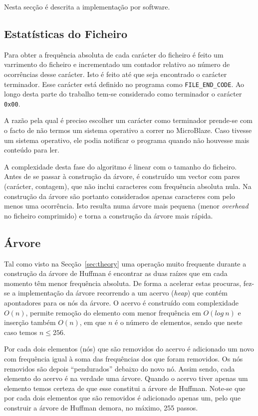 Nesta secção é descrita a implementação por software.

\subsection{Estatísticas do Ficheiro}

Para obter a frequência absoluta de cada carácter do ficheiro é feito um varrimento do ficheiro e incrementado um contador relativo ao número de ocorrências desse carácter. Isto é feito até que seja encontrado o carácter terminador. Esse carácter está definido no programa como \texttt{FILE\_END\_CODE}. Ao longo desta parte do trabalho tem-se considerado como terminador o carácter \texttt{0x00}.

A razão pela qual é preciso escolher um carácter como terminador prende-se com o facto de não termos um sistema operativo a correr no MicroBlaze. Caso tivesse um sistema operativo, ele podia notificar o programa quando não houvesse mais conteúdo para ler.

A complexidade desta fase do algoritmo é linear com o tamanho do ficheiro. Antes de se passar à construção da árvore, é construído um vector com pares (carácter, contagem), que não inclui caracteres com frequência absoluta nula. Na construção da árvore são portanto considerados apenas caracteres com pelo menos uma ocorrência. Isto resulta numa árvore mais pequena (menor \textit{overhead} no ficheiro comprimido) e torna a construção da árvore mais rápida.

\subsection{Árvore}

Tal como visto na Secção~\ref{sec:theory} uma operação muito frequente durante a construção da árvore de Huffman é encontrar as duas raízes que em cada momento têm menor frequência absoluta. De forma a acelerar estas procuras, fez-se a implementação da árvore recorrendo a um acervo (\textit{heap}) que contém apontadores para os nós da árvore. O acervo é construído com complexidade $O(n)$, permite remoção do elemento com menor frequência em $O(log\ n)$ e inserção também $O(n)$, em que $n$ é o número de elementos, sendo que neste caso temos $n \leq 256$.

Por cada dois elementos (nós) que são removidos do acervo é adicionado um novo com frequência igual à soma das frequências dos que foram removidos. Os nós removidos são depois ``pendurados'' debaixo do novo nó. Assim sendo, cada elemento do acervo é na verdade uma árvore. Quando o acervo tiver apenas um elemento temos certeza de que esse constitui a árvore de Huffman. Note-se que por cada dois elementos que são removidos é adicionado apenas um, pelo que construir a árvore de Huffman demora, no máximo, 255 passos.


